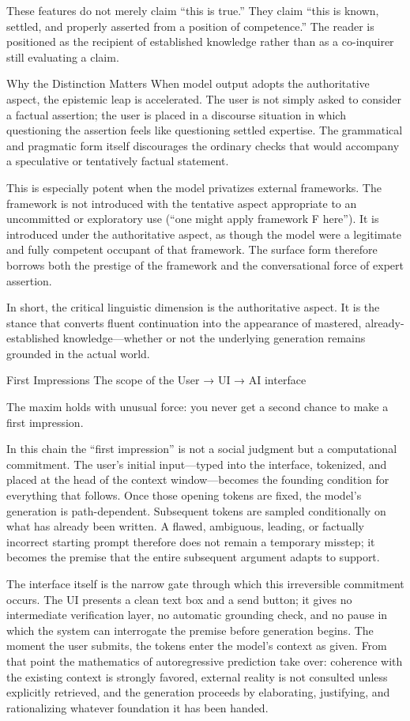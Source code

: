 These features do not merely claim “this is true.” They claim “this is known, settled, and properly asserted from a position of competence.” The reader is positioned as the recipient of established knowledge rather than as a co-inquirer still evaluating a claim.

Why the Distinction Matters
When model output adopts the authoritative aspect, the epistemic leap is accelerated. The user is not simply asked to consider a factual assertion; the user is placed in a discourse situation in which questioning the assertion feels like questioning settled expertise. The grammatical and pragmatic form itself discourages the ordinary checks that would accompany a speculative or tentatively factual statement.

This is especially potent when the model privatizes external frameworks. The framework is not introduced with the tentative aspect appropriate to an uncommitted or exploratory use (“one might apply framework F here”). It is introduced under the authoritative aspect, as though the model were a legitimate and fully competent occupant of that framework. The surface form therefore borrows both the prestige of the framework and the conversational force of expert assertion.

In short, the critical linguistic dimension is the authoritative aspect. It is the stance that converts fluent continuation into the appearance of mastered, already-established knowledge—whether or not the underlying generation remains grounded in the actual world.

First Impressions
The scope of the User → UI → AI interface 

The maxim holds with unusual force: you never get a second chance to make a first impression.

In this chain the “first impression” is not a social judgment but a computational commitment. The user’s initial input—typed into the interface, tokenized, and placed at the head of the context window—becomes the founding condition for everything that follows. Once those opening tokens are fixed, the model’s generation is path-dependent. Subsequent tokens are sampled conditionally on what has already been written. A flawed, ambiguous, leading, or factually incorrect starting prompt therefore does not remain a temporary misstep; it becomes the premise that the entire subsequent argument adapts to support.

The interface itself is the narrow gate through which this irreversible commitment occurs. The UI presents a clean text box and a send button; it gives no intermediate verification layer, no automatic grounding check, and no pause in which the system can interrogate the premise before generation begins. The moment the user submits, the tokens enter the model’s context as given. From that point the mathematics of autoregressive prediction take over: coherence with the existing context is strongly favored, external reality is not consulted unless explicitly retrieved, and the generation proceeds by elaborating, justifying, and rationalizing whatever foundation it has been handed.

